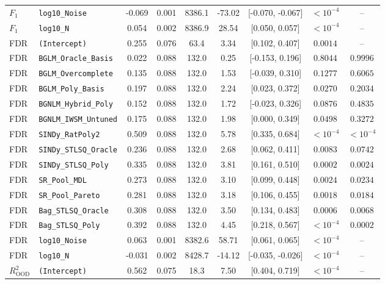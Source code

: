 \begin{table}[t]
\begin{tabular}{llccccccc}
$F_1$ & \texttt{log10\_Noise} & -0.069 & 0.001 & 8386.1 & -73.02 & [-0.070, -0.067] & $< 10^{-4}$ & -- \\
$F_1$ & \texttt{log10\_N} & 0.054 & 0.002 & 8386.9 & 28.54 & [0.050, 0.057] & $< 10^{-4}$ & -- \\
\midrule
FDR & \texttt{(Intercept)} & 0.255 & 0.076 & 63.4 & 3.34 & [0.102, 0.407] & $0.0014$ & -- \\
FDR & \texttt{BGLM\_Oracle\_Basis} & 0.022 & 0.088 & 132.0 & 0.25 & [-0.153, 0.196] & $0.8044$ & $0.9996$ \\
FDR & \texttt{BGLM\_Overcomplete} & 0.135 & 0.088 & 132.0 & 1.53 & [-0.039, 0.310] & $0.1277$ & $0.6065$ \\
FDR & \texttt{BGLM\_Poly\_Basis} & 0.197 & 0.088 & 132.0 & 2.24 & [0.023, 0.372] & $0.0270$ & $0.2034$ \\
FDR & \texttt{BGNLM\_Hybrid\_Poly} & 0.152 & 0.088 & 132.0 & 1.72 & [-0.023, 0.326] & $0.0876$ & $0.4835$ \\
FDR & \texttt{BGNLM\_IWSM\_Untuned} & 0.175 & 0.088 & 132.0 & 1.98 & [0.000, 0.349] & $0.0498$ & $0.3272$ \\
FDR & \texttt{SINDy\_RatPoly2} & 0.509 & 0.088 & 132.0 & 5.78 & [0.335, 0.684] & $< 10^{-4}$ & $< 10^{-4}$ \\
FDR & \texttt{SINDy\_STLSQ\_Oracle} & 0.236 & 0.088 & 132.0 & 2.68 & [0.062, 0.411] & $0.0083$ & $0.0742$ \\
FDR & \texttt{SINDy\_STLSQ\_Poly} & 0.335 & 0.088 & 132.0 & 3.81 & [0.161, 0.510] & $0.0002$ & $0.0024$ \\
FDR & \texttt{SR\_Pool\_MDL} & 0.273 & 0.088 & 132.0 & 3.10 & [0.099, 0.448] & $0.0024$ & $0.0234$ \\
FDR & \texttt{SR\_Pool\_Pareto} & 0.281 & 0.088 & 132.0 & 3.18 & [0.106, 0.455] & $0.0018$ & $0.0184$ \\
FDR & \texttt{Bag\_STLSQ\_Oracle} & 0.308 & 0.088 & 132.0 & 3.50 & [0.134, 0.483] & $0.0006$ & $0.0068$ \\
FDR & \texttt{Bag\_STLSQ\_Poly} & 0.392 & 0.088 & 132.0 & 4.45 & [0.218, 0.567] & $< 10^{-4}$ & $0.0002$ \\
FDR & \texttt{log10\_Noise} & 0.063 & 0.001 & 8382.6 & 58.71 & [0.061, 0.065] & $< 10^{-4}$ & -- \\
FDR & \texttt{log10\_N} & -0.031 & 0.002 & 8428.7 & -14.12 & [-0.035, -0.026] & $< 10^{-4}$ & -- \\
\midrule
$R^2_{\text{OOD}}$ & \texttt{(Intercept)} & 0.562 & 0.075 & 18.3 & 7.50 & [0.404, 0.719] & $< 10^{-4}$ & -- \\

\end{tabular}
\end{table}
